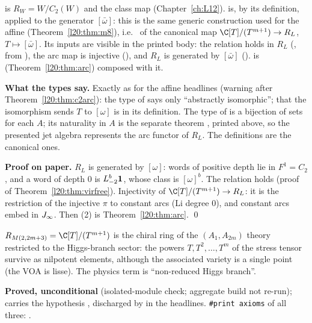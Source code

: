 \begin{dictionary}
 is $R_W=W/C_2(W)$ and  the class map (Chapter~\ref{ch:L12}).  is, by its
definition,  applied to the generator $[\bar\omega]$: this is the same generic
construction used for the affine  (Theorem~\ref{l20:thm:m8}), i.e.\  of the
canonical map $\C[T]/(T^{m+1})\to R_L$, $T\mapsto[\bar\omega]$. Its inputs are visible in the printed body: the relation
holds in $R_L$ (, from ), the arc map is injective
(), and $R_L$ is generated by $[\bar\omega]$ ().
 is  (Theorem~\ref{l20:thm:arc}) composed with it.

\textbf{What the types say.} Exactly as for the affine headlines (warning after Theorem~\ref{l20:thm:c2arc}): the type of
 says only ``abstractly isomorphic''; that the isomorphism sends $T$ to $[\omega]$ is in its definition. The type
of  is a bijection of sets for each $A$; its naturality in $A$ is the separate theorem
, printed above, so the presented jet algebra represents the arc
functor of $R_L$. The definitions are the canonical ones.
\end{dictionary}

\textbf{Proof on paper.} $R_L$ is generated by $[\omega]$: words of positive depth lie in $F^1=C_2$, and a word of depth $0$ is
$L_{-2}^b\mathbf{1}$, whose class is $[\omega]^b$. The relation holds (proof of Theorem~\ref{l20:thm:virfree}). Injectivity of
$\C[T]/(T^{m+1})\to R_L$: it is the restriction of the injective $\pi$ to constant arcs (Li degree $0$), and constant arcs embed
in $J_\infty$. Then (2) is Theorem~\ref{l20:thm:arc}. \qed

\begin{physics}
$R_{M(2,2m+3)}=\C[T]/(T^{m+1})$ is the chiral ring of the $(A_1,A_{2m})$ theory restricted to the Higgs-branch sector: the
powers $T,T^2,\dots,T^m$ of the stress tensor survive as nilpotent elements, although the associated variety is a single point
(the VOA is lisse). The physics term is ``non-reduced Higgs branch''.
\end{physics}

\begin{status}
\textbf{Proved, unconditional} (isolated-module check; aggregate build not re-run);  carries the hypothesis , discharged by
 in the headlines. \texttt{\#print axioms} of all three:
.
\end{status}

